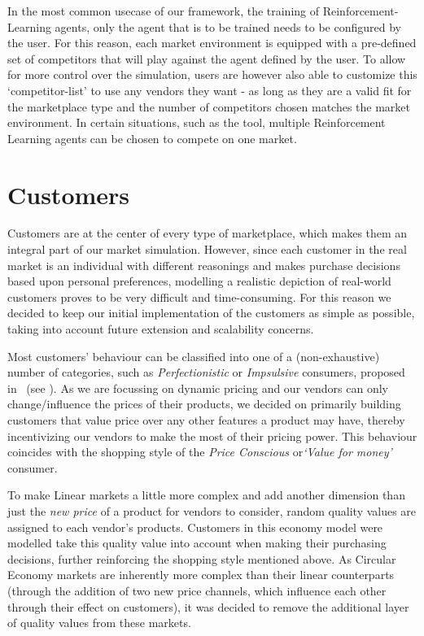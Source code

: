 In the most common usecase of our framework, the training of Reinforcement-Learning agents, only the agent that is to be trained needs to be configured by the user. For this reason, each market environment is equipped with a pre-defined set of competitors that will play against the agent defined by the user. To allow for more control over the simulation, users are however also able to customize this `competitor-list' to use any vendors they want - as long as they are a valid fit for the marketplace type and the number of competitors chosen matches the market environment. In certain situations, such as the  tool, multiple Reinforcement Learning agents can be chosen to compete on one market.

\section{Customers}\label{sec:Customers}

Customers are at the center of every type of marketplace, which makes them an integral part of our market simulation. However, since each customer in the real market is an individual with different reasonings and makes purchase decisions based upon personal preferences, modelling a realistic depiction of real-world customers proves to be very difficult and time-consuming. For this reason we decided to keep our initial implementation of the customers as simple as possible, taking into account future extension and scalability concerns.

Most customers' behaviour can be classified into one of a (non-exhaustive) number of categories, such as \emph{Perfectionistic} or \emph{Impsulsive} consumers, proposed in~\cite{ShoppingStyles} (see ). As we are focussing on dynamic pricing and our vendors can only change/influence the prices of their products, we decided on primarily building customers that value price over any other features a product may have, thereby incentivizing our vendors to make the most of their pricing power. This behaviour coincides with the shopping style of the \emph{Price Conscious} or\emph{`Value for money'} consumer.

To make Linear markets a little more complex and add another dimension than just the \emph{new price} of a product for vendors to consider, random quality values are assigned to each vendor's products. Customers in this economy model were modelled take this quality value into account when making their purchasing decisions, further reinforcing the shopping style mentioned above. As Circular Economy markets are inherently more complex than their linear counterparts (through the addition of two new price channels, which influence each other through their effect on customers), it was decided to remove the additional layer of quality values from these markets.

